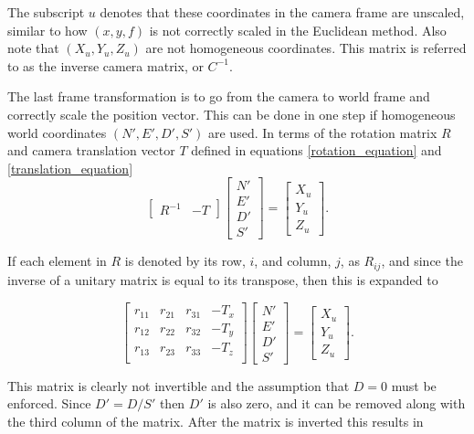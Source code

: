   The subscript $u$ denotes that these coordinates in the camera frame are unscaled, similar to how $(x,y,f)$ is not correctly scaled in the Euclidean method.  Also note that $(X_u, Y_u, Z_u)$ are not homogeneous coordinates.  This matrix is referred to as the inverse camera matrix, or $C^{-1}$. 
  
  The last frame transformation is to go from the camera to world frame and correctly scale the position vector.  This can be done in one step if homogeneous world coordinates $(N',E',D',S')$ are used.  In terms of the rotation matrix $R$ and camera translation vector $T$ defined in equations \ref{rotation_equation} and \ref{translation_equation}  
     \[
     \begin{bmatrix} R^{-1} & -T \end{bmatrix}
     \begin{bmatrix} N' \\ E' \\ D' \\ S' \end{bmatrix}
     =
     \begin{bmatrix} X_u \\ Y_u \\ Z_u \end{bmatrix}
     .
     \]
     
 If each element in $R$ is denoted by its row, $i$, and column, $j$, as $R_{ij}$, and since the inverse of a unitary matrix is equal to its transpose, then this is expanded to
 
      \[
      \begin{bmatrix} r_{11} & r_{21} & r_{31} & -T_x \\
                      r_{12} & r_{22} & r_{32} & -T_y \\
                      r_{13} & r_{23} & r_{33} & -T_z \\
      \end{bmatrix}
      \begin{bmatrix} N' \\ E' \\ D' \\ S' \end{bmatrix}
      =
      \begin{bmatrix} X_u \\ Y_u \\ Z_u \end{bmatrix}
      .
      \]
      
  This matrix is clearly not invertible and the assumption that $D=0$ must be enforced.  Since $D'=D/S'$ then $D'$ is also zero, and it can be removed along with the third column of the matrix.   After the matrix is inverted this results in 
  
